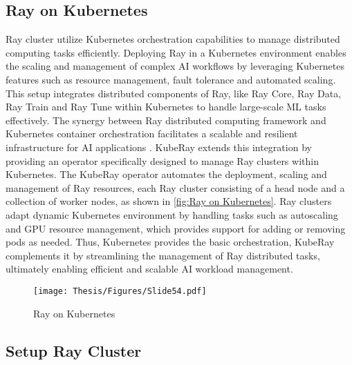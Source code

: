 \subsection{Ray on Kubernetes}

Ray cluster utilize Kubernetes orchestration capabilities to manage distributed computing tasks efficiently. Deploying Ray in a Kubernetes environment enables the scaling and management of complex AI workflows by leveraging Kubernetes features such as resource management, fault tolerance and automated scaling. This setup integrates distributed components of Ray, like Ray Core, Ray Data, Ray Train and Ray Tune within Kubernetes to handle large-scale ML tasks effectively. The synergy between Ray distributed computing framework and Kubernetes container orchestration facilitates a scalable and resilient infrastructure for AI applications \cite{moritz}. KubeRay extends this integration by providing an operator specifically designed to manage Ray clusters within Kubernetes. The KubeRay operator automates the deployment, scaling and management of Ray resources, each Ray cluster consisting of a head node and a collection of worker nodes, as shown in \autoref{fig:Ray on Kubernetes}. Ray clusters adapt dynamic Kubernetes environment by handling tasks such as autoscaling and GPU resource management, which provides support for adding or removing pods as needed. Thus, Kubernetes provides the basic orchestration, KubeRay complements it by streamlining the management of Ray distributed tasks, ultimately enabling efficient and scalable AI workload management. \cite{ray_doc}

\clearpage

\begin{figure}[h]
\centering
\texttt{[image: Thesis/Figures/Slide54.pdf]}
\caption{\label{fig:Ray on Kubernetes}Ray on Kubernetes \cite{ray_doc}}
\end{figure}



\subsection{Setup Ray Cluster}

